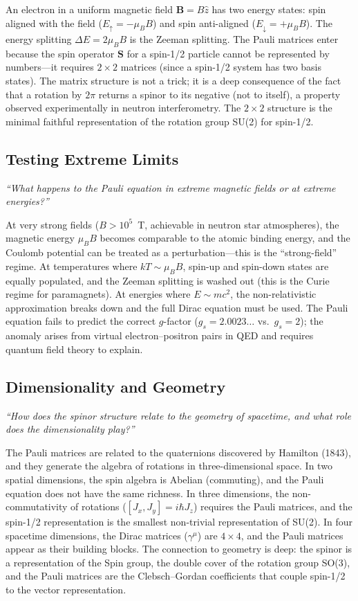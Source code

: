 An electron in a uniform magnetic field $\mathbf{B} = B\hat{z}$ has two energy states: spin aligned with the field ($E_{\uparrow} = -\mu_{B}B$) and spin anti-aligned ($E_{\downarrow} = +\mu_{B}B$). The energy splitting $\Delta E = 2\mu_{B}B$ is the Zeeman splitting. The Pauli matrices enter because the spin operator $\mathbf{S}$ for a spin-1/2 particle cannot be represented by numbers---it requires $2 \times 2$ matrices (since a spin-1/2 system has two basis states). The matrix structure is not a trick; it is a deep consequence of the fact that a rotation by $2\pi$ returns a spinor to its negative (not to itself), a property observed experimentally in neutron interferometry. The $2 \times 2$ structure is the minimal faithful representation of the rotation group SU(2) for spin-1/2.

\subsection*{Testing Extreme Limits}
\textit{``What happens to the Pauli equation in extreme magnetic fields or at extreme energies?''}

At very strong fields ($B > 10^{5}$~T, achievable in neutron star atmospheres), the magnetic energy $\mu_{B}B$ becomes comparable to the atomic binding energy, and the Coulomb potential can be treated as a perturbation---this is the ``strong-field'' regime. At temperatures where $kT \sim \mu_{B}B$, spin-up and spin-down states are equally populated, and the Zeeman splitting is washed out (this is the Curie regime for paramagnets). At energies where $E \sim mc^{2}$, the non-relativistic approximation breaks down and the full Dirac equation must be used. The Pauli equation fails to predict the correct $g$-factor ($g_{s} = 2.0023\ldots$ vs.\ $g_{s} = 2$); the anomaly arises from virtual electron--positron pairs in QED and requires quantum field theory to explain.

\subsection*{Dimensionality and Geometry}
\textit{``How does the spinor structure relate to the geometry of spacetime, and what role does the dimensionality play?''}

The Pauli matrices are related to the quaternions discovered by Hamilton (1843), and they generate the algebra of rotations in three-dimensional space. In two spatial dimensions, the spin algebra is Abelian (commuting), and the Pauli equation does not have the same richness. In three dimensions, the non-commutativity of rotations ($[J_{x}, J_{y}] = i\hbar J_{z}$) requires the Pauli matrices, and the spin-1/2 representation is the smallest non-trivial representation of SU(2). In four spacetime dimensions, the Dirac matrices ($\gamma^{\mu}$) are $4 \times 4$, and the Pauli matrices appear as their building blocks. The connection to geometry is deep: the spinor is a representation of the Spin group, the double cover of the rotation group SO(3), and the Pauli matrices are the Clebsch--Gordan coefficients that couple spin-1/2 to the vector representation.

